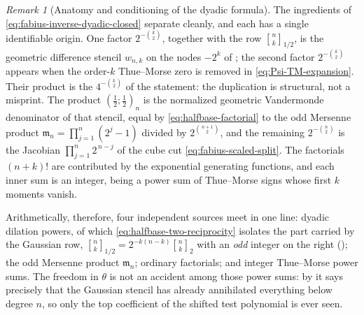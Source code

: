 \documentclass[11pt,oneside,openany]{book}
\theoremstyle{definition}
\theoremstyle{remark}
\newtheorem{remark}[remark]{Remark}
\newcommand{\Qbinom}[3]{\genfrac{[}{]}{0pt}{}{#1}{#2}_{#3}}
\begin{document}
\begin{remark}[Anatomy and conditioning of the dyadic formula]\label{rem:dyadic-formula-anatomy}
The ingredients of \eqref{eq:fabius-inverse-dyadic-closed} separate cleanly, and each has a
single identifiable origin.  One factor $2^{-\binom k2}$, together with the row
$\Qbinom nk{1/2}$, is the geometric difference stencil $w_{n,k}$ on the nodes $-2^{k}$ of
; the second factor $2^{-\binom k2}$ appears when the order-$k$
Thue--Morse zero is removed in \eqref{eq:Psi-TM-expansion}.  Their product is the
$4^{-\binom k2}$ of the statement: the duplication is structural, not a misprint.  The
product $\left(\tfrac12;\tfrac12\right)_n$ is the normalized geometric Vandermonde
denominator of that stencil, equal by \eqref{eq:halfbase-factorial} to the odd Mersenne
product $\mathfrak m_n=\prod_{j=1}^{n}(2^{j}-1)$ divided by $2^{\binom{n+1}{2}}$, and the
remaining $2^{-\binom n2}$ is the Jacobian $\prod_{j=1}^{n}2^{\,n-j}$ of the cube cut
\eqref{eq:fabius-scaled-split}.  The factorials $(n+k)!$ are contributed by the
exponential generating functions, and each inner sum is an integer, being a power sum of
Thue--Morse signs whose first $k$ moments vanish.

Arithmetically, therefore, four independent sources meet in one line: dyadic dilation
powers, of which \eqref{eq:halfbase-two-reciprocity} isolates the part carried by the
Gaussian row, $\Qbinom nk{1/2}=2^{-k(n-k)}\Qbinom nk2$ with an \emph{odd} integer on the
right (); the odd Mersenne product $\mathfrak m_n$;
ordinary factorials; and integer Thue--Morse power sums.  The freedom in $\theta$ is not
an accident among those power sums: by  it says precisely
that the Gaussian stencil has already annihilated everything below degree $n$, so only
the top coefficient of the shifted test polynomial is ever seen.


\end{remark}
\end{document}
